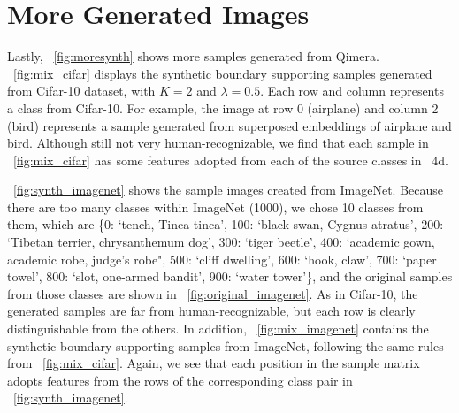 \documentclass{article}
\newcommand{\aname}{Qimera\xspace}
\begin{document}
\begin{comment}
\subsection{Feature Space Distance}
\tablename~\ref{tab:distance} shows the distance, measured in a piecewise linear manner, with 100 points between the curves. 
The average column shows the average of all 45 pairs, not just the example 9 pairs we display as the examples.
It is clearly shown that the distance between the clusters in the feature space decreases with disentanglement mapping by @\%, although both types of curves are moderately flat.
\end{comment}


\section{More Generated Images}
Lastly, \figurename~\ref{fig:moresynth} shows more samples generated from \aname. 
\figurename~\ref{fig:mix_cifar} displays the synthetic boundary supporting samples generated from Cifar-10 dataset, with $K=2$ and $\lambda=0.5$.
Each row and column represents a class from Cifar-10.
For example, the image at row 0 (airplane) and column 2 (bird) represents a sample generated from superposed embeddings of airplane and bird.
Although still not very human-recognizable, we find that each sample in \figurename~\ref{fig:mix_cifar} has some features adopted from each of the source classes in \figurename~4d.

\figurename~\ref{fig:synth_imagenet} shows the sample images created from ImageNet.
Because there are too many classes within ImageNet (1000), we chose 10 classes from them, which are 
\{0: `tench, Tinca tinca',
100: `black swan, Cygnus atratus',
200: `Tibetan terrier, chrysanthemum dog',
300: `tiger beetle',
400: `academic gown, academic robe, judge's robe",
500: `cliff dwelling',
600: `hook, claw',
700: `paper towel',
800: `slot, one-armed bandit',
900: `water tower'\}, 
and the original samples from those classes are shown in \figurename~\ref{fig:original_imagenet}.
As in Cifar-10, the generated samples are far from human-recognizable, but each row is clearly distinguishable from the others.
In addition, \figurename~\ref{fig:mix_imagenet} contains the synthetic boundary supporting samples from ImageNet, following the same rules from \figurename~\ref{fig:mix_cifar}.
Again, we see that each position in the sample matrix adopts features from the rows of the corresponding class pair in \figurename~\ref{fig:synth_imagenet}.
\end{document}
